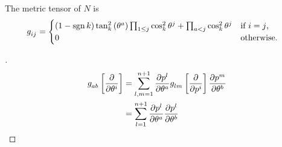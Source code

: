 \documentclass[../main.tex]{subfiles}
\begin{document}
\begin{lemma}\label{M:MetricTensor}
    The metric tensor of $N$ is
    \begin{align*}
        \tensor{g}{_i_j} & =
        \begin{cases}
            \left(1-\sign{k}\right)
            \tan_k^2\left(\tensor{\theta}{^a}\right)
            \prod_{1\le j}{\cos_k^2\tensor{\theta}{^j}}
            +
            \prod_{a<j}{\cos_k^2\tensor{\theta}{^j}} & \text{if $i=j$,}  \\
            0                                        & \text{otherwise.} \\
        \end{cases}
    \end{align*}
\end{lemma}
\begin{proof}[]
    \begin{align*}
        \tensor{g}{_a_b}\left[\frac{\partial}{\partial\tensor{\theta}{^i}}\right]
         & = \sum_{l,m=1}^{n+1}{
        \frac{\partial{\tensor{p}{^l}}}{\partial{\tensor{\theta}{^a}}}
        \tensor{g}{_l_m}\left[\frac{\partial}{\partial\tensor{p}{^i}}\right]
        \frac{\partial{\tensor{p}{^m}}}{\partial{\tensor{\theta}{^b}}}
        }                        \\
         & = \sum_{l=1}^{n+1}{
        \frac{\partial{\tensor{p}{^l}}}{\partial{\tensor{\theta}{^a}}}
        \frac{\partial{\tensor{p}{^l}}}{\partial{\tensor{\theta}{^b}}}
        }
    \end{align*}


\end{proof}
\end{document}
